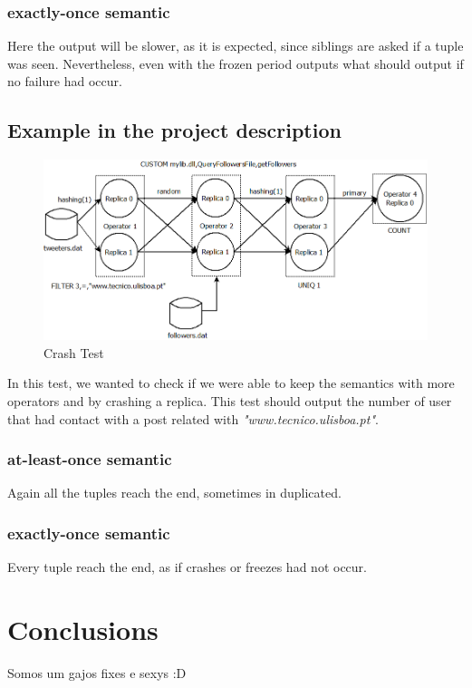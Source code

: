 \documentclass[times, 10pt,twocolumn]{article}
\begin{document}
\subsubsection{exactly-once semantic}
Here the output will be slower, as it is expected, since siblings are asked if a tuple was seen. Nevertheless, even with the frozen period outputs what should output if no failure had occur.

\subsection{Example in the project description}
\begin{figure}[h]
	\centering
	\includegraphics[scale=0.22]{"Tests/second"}
	\caption{Crash Test} 
	\label{fig:state}
\end{figure}

In this test, we wanted to check if we were able to keep the semantics with more operators and by  crashing a replica. This test should output the number of user that had contact with a post related with \textit{"www.tecnico.ulisboa.pt"}.

\subsubsection{at-least-once semantic}
Again all the tuples reach the end, sometimes in duplicated.

\subsubsection{exactly-once semantic}
Every tuple reach the end, as if crashes or freezes had not occur.


\section{Conclusions}

Somos um gajos fixes e sexys :D

\nocite{ex1,ex2}


\end{document}
